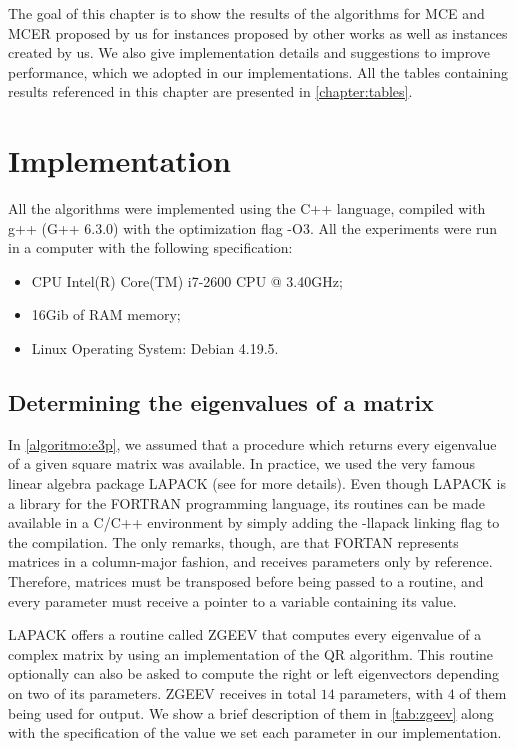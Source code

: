 The goal of this chapter is to show the results of the algorithms for MCE and MCER proposed by us for instances proposed by other works as well as instances created by us. 
We also give implementation details and suggestions to improve performance, which we adopted in our implementations.
All the tables containing results referenced in this chapter are presented in \autoref{chapter:tables}.

\section{Implementation}

All the algorithms were implemented using the C++ language, compiled with g++ (G++ 6.3.0) with the optimization flag -O3. All the experiments were run in a computer with the following specification:
\begin{itemize}
	\item CPU Intel(R) Core(TM) i7-2600 CPU @ 3.40GHz;
	\item 16Gib of RAM memory;
	\item Linux Operating System: Debian 4.19.5.
\end{itemize}
\subsection{Determining the eigenvalues of a matrix}

In \autoref{algoritmo:e3p}, we assumed that a procedure which returns every eigenvalue of a given square matrix was available. In practice, we used the very famous linear algebra package LAPACK (see  for more details).
Even though LAPACK is a library for the FORTRAN programming language, its routines can be made available in a C/C++ environment by simply adding the -llapack linking flag to the compilation. The only remarks, though, are that FORTAN represents matrices in a column-major fashion, and receives parameters only by reference. Therefore, matrices must be transposed before being passed to a routine, and every parameter must receive a pointer to a variable containing its value.

LAPACK offers a routine called ZGEEV that computes every eigenvalue of a complex matrix by using an implementation of the QR algorithm. 
This routine optionally can also be asked to compute the right or left eigenvectors depending on two of its parameters. 
ZGEEV receives in total $14$ parameters, with $4$ of them being used for output. We show a brief description of them in \autoref{tab:zgeev} along with the specification of the value we set each parameter in our implementation.

